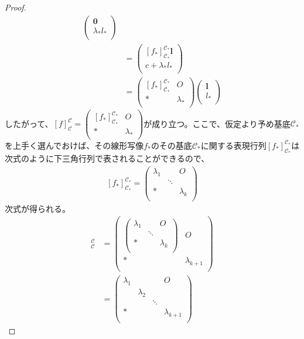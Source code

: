 \documentclass[dvipdfmx]{jsarticle}
\begin{document}
\begin{proof}
\begin{align*}
\begin{pmatrix}
\mathbf{0} \\
\lambda_{*}l_{*} \\
\end{pmatrix}\\
&= \begin{pmatrix}
\left[ f_{*} \right]_{\mathcal{C}_{*}}^{\mathcal{C}_{*}}\mathbf{l} \\
c + \lambda_{*}l_{*} \\
\end{pmatrix}\\
&= \begin{pmatrix}
\left[ f_{*} \right]_{\mathcal{C}_{*}}^{\mathcal{C}_{*}} & O \\
* & \lambda_{*} \\
\end{pmatrix}\begin{pmatrix}
\mathbf{l} \\
l_{*} \\
\end{pmatrix}
\end{align*}
したがって、$[ f]_{\mathcal{C}}^{\mathcal{C}} = \begin{pmatrix}
\left[ f_{*} \right]_{\mathcal{C}_{*}}^{\mathcal{C}_{*}} & O \\
* & \lambda_{*} \\
\end{pmatrix}$が成り立つ。ここで、仮定より予め基底$\mathcal{C}_{*}$を上手く選んでおけば、その線形写像$f_{*}$のその基底$\mathcal{C}_{*}$に関する表現行列$\left[ f_{*} \right]_{\mathcal{C}_{*}}^{\mathcal{C}_{*}}$は次式のように下三角行列で表されることができるので、
\begin{align*}
\left[ f_{*} \right]_{\mathcal{C}_{*}}^{\mathcal{C}_{*}} = \begin{pmatrix}
\lambda_{1} & \  & O \\
\  & \ddots & \  \\
* & \  & \lambda_{k} \\
\end{pmatrix}
\end{align*}
次式が得られる。
\begin{align*}
[ f]_{\mathcal{C}}^{\mathcal{C}} &= \begin{pmatrix}
\begin{pmatrix}
\lambda_{1} & \  & O \\
\  & \ddots & \  \\
* & \  & \lambda_{k} \\
\end{pmatrix} & O \\
* & \lambda_{k + 1} \\
\end{pmatrix}\\
&= \begin{pmatrix}
\lambda_{1} & \  & \  & O \\
\  & \lambda_{2} & \  & \  \\
\  & \  & \ddots & \  \\
* & \  & \  & \lambda_{k + 1} \\
\end{pmatrix}
\end{align*}
\end{proof}
\end{document}
